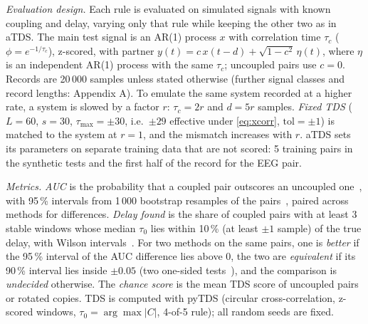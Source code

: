 \documentclass[11pt,a4paper]{article}
\begin{document}
\emph{Evaluation design.} Each rule is evaluated on simulated signals with known coupling and delay, varying only that rule while keeping the other two as in aTDS. The main test signal is an AR(1) process $x$ with correlation time $\tau_c$ ($\phi = e^{-1/\tau_c}$), z-scored, with partner $y(t) = c\, x(t-d) + \sqrt{1-c^2}\,\eta(t)$, where $\eta$ is an independent AR(1) process with the same $\tau_c$; uncoupled pairs use $c = 0$. Records are 20\,000 samples unless stated otherwise (further signal classes and record lengths: Appendix A). To emulate the same system recorded at a higher rate, a system is slowed by a factor $r$: $\tau_c = 2r$ and $d = 5r$ samples. \emph{Fixed TDS} ($L = 60$, $s = 30$, $\tau_{\max} = \pm30$, i.e.\ $\pm29$ effective under \cref{eq:xcorr}, $\mathrm{tol} = \pm1$) is matched to the system at $r = 1$, and the mismatch increases with $r$. aTDS sets its parameters on separate training data that are not scored: 5 training pairs in the synthetic tests and the first half of the record for the EEG pair.

\emph{Metrics.} \emph{AUC} is the probability that a coupled pair outscores an uncoupled one~\cite{Hanley1982MeaningUse}, with 95\,\% intervals from 1\,000 bootstrap resamples of the pairs~\cite{Efron1979BootstrapMethods}, paired across methods for differences. \emph{Delay found} is the share of coupled pairs with at least 3 stable windows whose median $\tau_0$ lies within 10\,\% (at least $\pm1$ sample) of the true delay, with Wilson intervals~\cite{Wilson1927ProbableInference}. For two methods on the same pairs, one is \emph{better} if the 95\,\% interval of the AUC difference lies above 0, the two are \emph{equivalent} if its 90\,\% interval lies inside $\pm0.05$ (two one-sided tests~\cite{Schuirmann1987ComparisonTwo}), and the comparison is \emph{undecided} otherwise. The \emph{chance score} is the mean TDS score of uncoupled pairs or rotated copies. TDS is computed with pyTDS (circular cross-correlation, z-scored windows, $\tau_0 = \arg\max|C|$, 4-of-5 rule); all random seeds are fixed.
\end{document}
